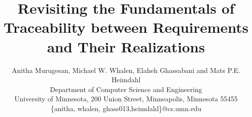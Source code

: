 \documentclass{IEEEtran}
\begin{document}
    \newcommand{\mike}[1]{\textcolor{green}{\emph {Mike: #1}}}
    \newcommand{\mats}[1]{\textcolor{blue}{\sc Mats: #1}}
    \newcommand{\sanjai}[1]{\textcolor{magenta}{\sc Sanjai: #1}}
    \newcommand{\anitha}[1]{\textcolor{red}{\emph {Anitha: #1}}}
    \newcommand{\req}[1]{\textcolor{blue}{\begin{quotation}\emph{#1}\end{quotation}}} %
    \newcommand{\eq}[1]{\textcolor{blue}{\begin{equation} #1\end{equation}}}
    \sloppypar


\title{\huge{Revisiting the Fundamentals of Traceability between Requirements and Their Realizations}}

\author{Anitha Murugesan, Michael W. Whalen, Elaheh Ghassabani and Mats P.E. Heimdahl \\
      {Department of Computer Science and Engineering}\\
      {University of Minnesota, 200 Union Street, Minneapolis, Minnesota 55455}\\
      {\{anitha, whalen, ghass013,heimdahl\}@cs.umn.edu}
}

    \maketitle
\begin{abstract}

\end{abstract}
    
    
    
    




\end{document}
